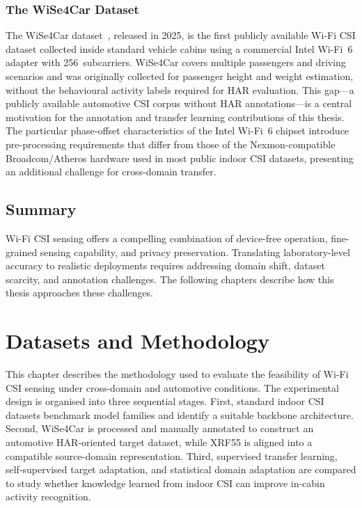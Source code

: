 \documentclass[english,bibtex]{kththesis}
\begin{document}
\subsection{The WiSe4Car Dataset}
\label{sec:wisedataset}

The WiSe4Car dataset~\cite{markert2025wise4car}, released in 2025, is the first publicly available Wi-Fi CSI dataset collected inside standard vehicle cabins using a commercial Intel Wi-Fi~6 adapter with 256~subcarriers. WiSe4Car covers multiple passengers and driving scenarios and was originally collected for passenger height and weight estimation, without the behavioural activity labels required for HAR evaluation. This gap---a publicly available automotive CSI corpus without HAR annotations---is a central motivation for the annotation and transfer learning contributions of this thesis. The particular phase-offset characteristics of the Intel Wi-Fi~6 chipset introduce pre-processing requirements that differ from those of the Nexmon-compatible Broadcom/Atheros hardware used in most public indoor CSI datasets, presenting an additional challenge for cross-domain transfer.

\section{Summary}

Wi-Fi CSI sensing offers a compelling combination of device-free operation, fine-grained sensing capability, and privacy preservation. Translating laboratory-level accuracy to realistic deployments requires addressing domain shift, dataset scarcity, and annotation challenges. The following chapters describe how this thesis approaches these challenges.

\cleardoublepage

\chapter{Datasets and Methodology}
\label{ch:methods}

This chapter describes the methodology used to evaluate the feasibility of Wi-Fi CSI sensing under cross-domain and automotive conditions. The experimental design is organised into three sequential stages. First, standard indoor CSI datasets benchmark model families and identify a suitable backbone architecture. Second, WiSe4Car is processed and manually annotated to construct an automotive HAR-oriented target dataset, while XRF55 is aligned into a compatible source-domain representation. Third, supervised transfer learning, self-supervised target adaptation, and statistical domain adaptation are compared to study whether knowledge learned from indoor CSI can improve in-cabin activity recognition.
\end{document}
